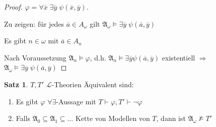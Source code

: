 \documentclass[12pt,parskip=full]{scrartcl}
\theoremstyle{definition}
\newtheorem{theorem}{Satz}[section]
\begin{document}
	\begin{proof}
		$\varphi = \forall \overline{x} \; \exists \overline{y} \; \psi(\overline{x}, \overline{y})$.
		
		Zu zeigen: für jedes $\overline{a} \in A_\omega$ gilt $\mathfrak{A}_\omega \models \exists \overline{y} \; \psi(\overline{a}, \overline{y})$
		
		Es gibt $n \in \omega$ mit $\overline{a} \in A_n$
		
		Nach Voraussetzung $\mathfrak{A}_n \models \varphi$, d.h. $\mathfrak{A}_n \models \exists \overline{y} \psi(\overline{a}, \overline{y})$ existentiell $\Rightarrow$ $\mathfrak{A}_\omega \models \exists \overline{y} \; \psi(\overline{a}, \overline{y})$
	\end{proof}

	\begin{theorem}
		$T, T'$ $\mathcal{L}$-Theorien Äquivalent sind:
		\begin{enumerate}
			\item Es gibt $\varphi$ $\forall \exists$-Aussage mit $T \vdash \varphi, T' \vdash \lnot \varphi$
			\item Falls $\mathfrak{A}_0 \subseteq \mathfrak{A}_1 \subseteq \dots$ Kette von Modellen von $T$, dann ist $\mathfrak{A}_\omega \not\models T'$
		\end{enumerate}
	\end{theorem}
\end{document}
